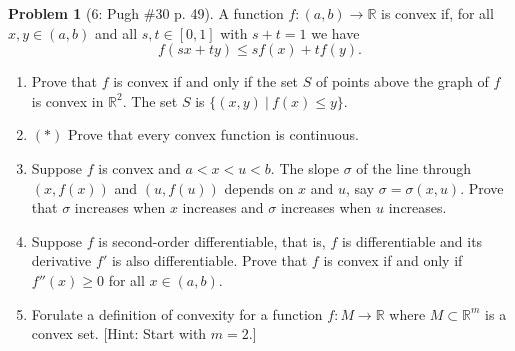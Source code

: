 \documentclass{article}
\theoremstyle{definition}
\newtheorem*{prob}{Problem}
\theoremstyle{theorem}
\newcommand{\R}{\mathbb{R}}
\begin{document}
\begin{prob}[6: Pugh \#30 p. 49]
A function $f: (a,b) \to \R$ is convex if, for all $x,y \in (a,b)$ and all $s,t \in [0,1]$ with $s+t=1$ we have $$f(sx + ty) \leq sf(x) + tf(y).$$
\begin{enumerate}
    \item Prove that $f$ is convex if and only if the set $S$ of points above the graph of $f$ is convex in $\R^2$. The set $S$ is $\{ (x,y) \ | \ f(x) \leq y\}$.
    \item $(*)$ Prove that every convex function is continuous.
    \item Suppose $f$ is convex and $a < x < u < b$. The slope $\sigma$ of the line through $(x,f(x))$ and $(u,f(u))$ depends on $x$ and $u$, say $\sigma = \sigma(x,u)$. Prove that $\sigma$ increases when $x$ increases and $\sigma$ increases when $u$ increases.
    \item Suppose $f$ is second-order differentiable, that is, $f$ is differentiable and its derivative $f'$ is also differentiable. Prove that $f$ is convex if and only if $f''(x) \geq 0$ for all $x \in (a,b)$.
    \item Forulate a definition of convexity for a function $f: M \to \R$ where $M \subset \R^m$ is a convex set. [Hint: Start with $m=2$.]
\end{enumerate}
\end{prob}
\end{document}
